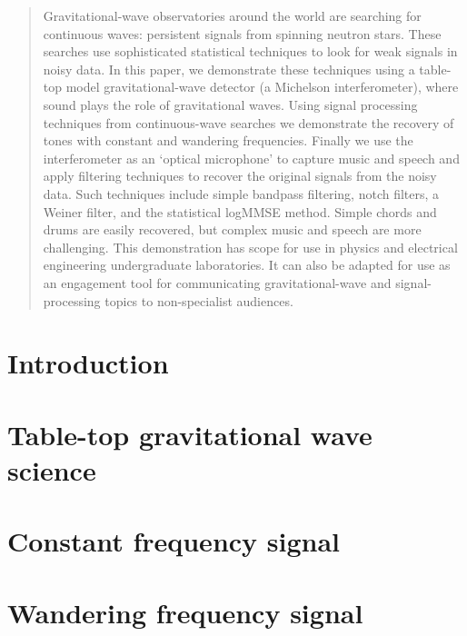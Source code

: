 \documentclass[pra,superscriptaddress,reprint,amsmath,amssymb,nofootinbib]{revtex4-1}
\begin{document}
\begin{abstract}
Gravitational-wave observatories around the world are searching for continuous waves: persistent signals from spinning neutron stars. 
These searches use sophisticated statistical techniques to look for weak signals in noisy data. 
In this paper, we demonstrate these techniques using a table-top model gravitational-wave detector (a Michelson interferometer), where sound plays the role of gravitational waves. 
Using signal processing techniques from continuous-wave searches we demonstrate the recovery of tones with constant and wandering frequencies. 
Finally we use the interferometer as an `optical microphone' to capture music and speech and apply filtering techniques to recover the original signals from the noisy data. Such techniques include simple bandpass filtering, notch filters, a Weiner filter, and the statistical logMMSE method.  
Simple chords and drums are easily recovered, but complex music and speech are more challenging. 
This demonstration has scope for use in physics and electrical engineering undergraduate laboratories. 
It can also be adapted for use as an engagement tool for communicating gravitational-wave and signal-processing topics to non-specialist audiences. 
\end{abstract}



\maketitle

\section{Introduction}
\label{sec:introduction}



\section{Table-top gravitational wave science}
\label{sec:ifo}



\section{Constant frequency signal}
\label{sec:single_tone}


 
\section{Wandering frequency signal}
\label{sec:viterbi_wandering}

\end{document}
